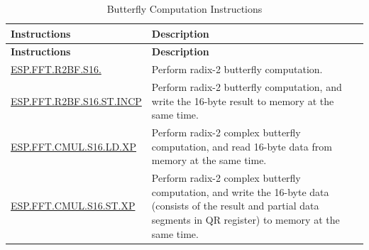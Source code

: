 \begin{longtable}[c]{|l|m{10cm}|}
    \caption{Butterfly Computation Instructions}
    \label{tab:pie-butterfly-instructions}\\
    \hline
    \rowcolor{lightgray}
    \textbf{Instructions} & \textbf{Description} \\\hline
    \endfirsthead
    \rowcolor{lightgray}
    \textbf{Instructions} & \textbf{Description} \\\hline
    \endhead
    \endfoot
    
    \hyperref[instruction:ESPFFTR2BFS16]{ESP.FFT.R2BF.S16.} & Perform radix-2 butterfly computation.
    \\\hline
    \hyperref[instruction:ESPFFTR2BFS16STINCP]{ESP.FFT.R2BF.S16.ST.INCP} & Perform radix-2 butterfly computation, and write the 16-byte result to memory at the same time.
    \\\hline
    \hyperref[instruction:ESPFFTCMULS16LDXP]{ESP.FFT.CMUL.S16.LD.XP} & Perform radix-2 complex butterfly computation, and read 16-byte data from memory at the same time.
    \\\hline
    \hyperref[instruction:ESPFFTCMULS16STXP]{ESP.FFT.CMUL.S16.ST.XP} & Perform radix-2 complex butterfly computation, and write the 16-byte data (consists of the result and partial data segments in QR register) to memory at the same time.
    \\\hline
\end{longtable}